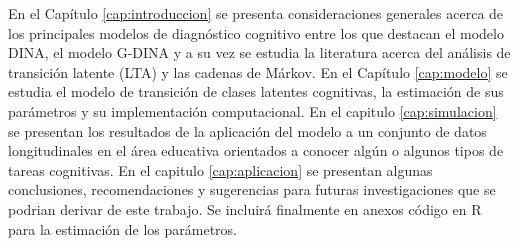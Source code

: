 		En el Cap\'{i}tulo \ref{cap:introduccion} se presenta consideraciones generales acerca de los principales modelos de diagn\'{o}stico cognitivo entre los que destacan el modelo DINA, el modelo G-DINA y a su vez se estudia la literatura acerca del an\'{a}lisis de transici\'{o}n latente (LTA) y las cadenas de M\'{a}rkov. En el Cap\'{i}tulo \ref{cap:modelo} se estudia el modelo de transici\'{o}n de clases latentes cognitivas, la estimaci\'{o}n de sus par\'{a}metros y su implementaci\'{o}n computacional. En el capitulo \ref{cap:simulacion} se presentan los resultados de la aplicaci\'{o}n del modelo a un conjunto de datos longitudinales en el \'{a}rea educativa orientados a conocer alg\'{u}n o algunos tipos de tareas cognitivas. En el capitulo \ref{cap:aplicacion} se presentan algunas conclusiones, recomendaciones y sugerencias para futuras investigaciones que se podrian derivar de este trabajo. Se incluir\'{a} finalmente en anexos c\'{o}digo en R para la estimaci\'{o}n de los par\'{a}metros.
		
		
		